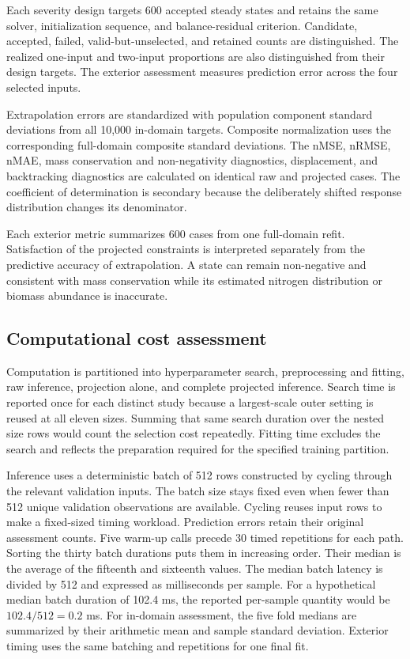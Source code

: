 Each severity design targets 600 accepted steady states and retains the same solver, initialization sequence, and balance-residual criterion. Candidate, accepted, failed, valid-but-unselected, and retained counts are distinguished. The realized one-input and two-input proportions are also distinguished from their design targets. The exterior assessment measures prediction error across the four selected inputs.

Extrapolation errors are standardized with population component standard deviations from all 10,000 in-domain targets. Composite normalization uses the corresponding full-domain composite standard deviations. The nMSE, nRMSE, nMAE, mass conservation and non-negativity diagnostics, displacement, and backtracking diagnostics are calculated on identical raw and projected cases. The coefficient of determination is secondary because the deliberately shifted response distribution changes its denominator.

Each exterior metric summarizes 600 cases from one full-domain refit. Satisfaction of the projected constraints is interpreted separately from the predictive accuracy of extrapolation. A state can remain non-negative and consistent with mass conservation while its estimated nitrogen distribution or biomass abundance is inaccurate.

\subsection{Computational cost assessment}

Computation is partitioned into hyperparameter search, preprocessing and fitting, raw inference, projection alone, and complete projected inference. Search time is reported once for each distinct study because a largest-scale outer setting is reused at all eleven sizes. Summing that same search duration over the nested size rows would count the selection cost repeatedly. Fitting time excludes the search and reflects the preparation required for the specified training partition.

Inference uses a deterministic batch of 512 rows constructed by cycling through the relevant validation inputs. The batch size stays fixed even when fewer than 512 unique validation observations are available. Cycling reuses input rows to make a fixed-sized timing workload. Prediction errors retain their original assessment counts. Five warm-up calls precede 30 timed repetitions for each path. Sorting the thirty batch durations puts them in increasing order. Their median is the average of the fifteenth and sixteenth values. The median batch latency is divided by 512 and expressed as milliseconds per sample. For a hypothetical median batch duration of 102.4 ms, the reported per-sample quantity would be $102.4/512=0.2$ ms. For in-domain assessment, the five fold medians are summarized by their arithmetic mean and sample standard deviation. Exterior timing uses the same batching and repetitions for one final fit.

